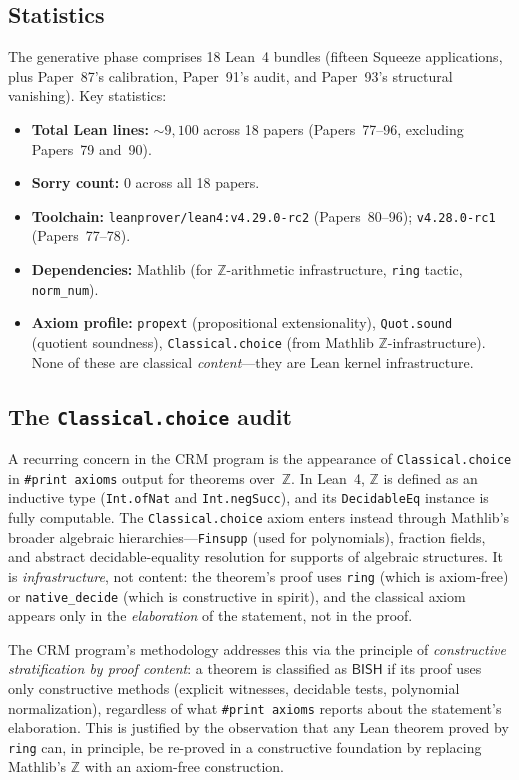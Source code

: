 \documentclass[11pt]{article}
\theoremstyle{plain}
\theoremstyle{definition}
\theoremstyle{remark}
\newcommand{\ZZ}{\mathbb{Z}}
\newcommand{\BISH}{\mathsf{BISH}}
\begin{document}
\subsection{Statistics}

The generative phase comprises 18 Lean~4 bundles (fifteen Squeeze
applications, plus Paper~87's calibration, Paper~91's audit,
and Paper~93's structural vanishing).
Key statistics:

\begin{itemize}[nosep]
\item \textbf{Total Lean lines:} ${\sim}9{,}100$ across 18 papers
  (Papers~77--96, excluding Papers~79 and~90).
\item \textbf{Sorry count:} 0 across all 18 papers.
\item \textbf{Toolchain:} \texttt{leanprover/lean4:v4.29.0-rc2}
  (Papers~80--96); \texttt{v4.28.0-rc1} (Papers~77--78).
\item \textbf{Dependencies:} Mathlib (for $\ZZ$-arithmetic
  infrastructure, \texttt{ring} tactic, \texttt{norm\_num}).
\item \textbf{Axiom profile:} \texttt{propext} (propositional
  extensionality), \texttt{Quot.sound} (quotient soundness),
  \texttt{Classical.choice} (from Mathlib $\ZZ$-infrastructure).
  None of these are classical \emph{content}---they are Lean kernel
  infrastructure.
\end{itemize}

\subsection{The \texttt{Classical.choice} audit}

A recurring concern in the CRM program is the appearance of
\texttt{Classical.choice} in \texttt{\#print axioms} output for
theorems over~$\ZZ$.  In Lean~4, $\ZZ$ is defined as an inductive
type (\texttt{Int.ofNat} and \texttt{Int.negSucc}), and its
\texttt{DecidableEq} instance is fully computable.  The
\texttt{Classical.choice} axiom enters instead through Mathlib's
broader algebraic hierarchies---\texttt{Finsupp} (used for
polynomials), fraction fields, and abstract decidable-equality
resolution for supports of algebraic structures.  It is
\emph{infrastructure}, not content: the theorem's proof uses
\texttt{ring} (which is axiom-free) or \texttt{native\_decide}
(which is constructive in spirit), and the classical axiom appears
only in the \emph{elaboration} of the statement, not in the proof.

The CRM program's methodology addresses this via the principle of
\emph{constructive stratification by proof content}: a theorem is
classified as $\BISH$ if its proof uses only constructive methods
(explicit witnesses, decidable tests, polynomial normalization),
regardless of what \texttt{\#print axioms} reports about the
statement's elaboration.  This is justified by the observation that
any Lean theorem proved by \texttt{ring} can, in principle, be
re-proved in a constructive foundation by replacing Mathlib's $\ZZ$
with an axiom-free construction.
\end{document}
